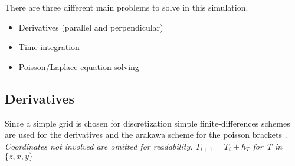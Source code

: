 There are three different main problems to solve in this simulation.
\begin{itemize}
    \item Derivatives (parallel and perpendicular)
    \item Time integration
    \item Poisson/Laplace equation solving
\end{itemize}

\subsection{Derivatives}
Since a simple grid is chosen for discretization simple finite-differences schemes are used for the derivatives and the arakawa scheme for the poisson brackets \cite{arakawa}.\\
\textit{Coordinates not involved are omitted for readability. $T_{i + 1} = T_i + h_T$ for T in $\{z, x, y\}$}
